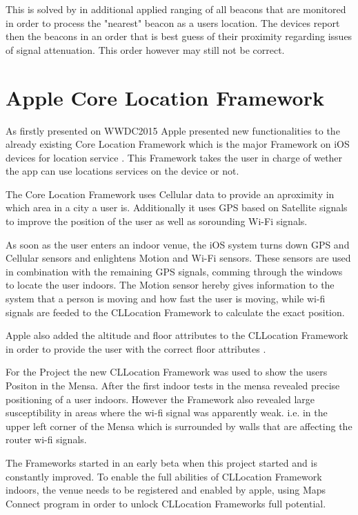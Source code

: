 This is solved by in additional applied ranging of all beacons that are monitored in order to process the "nearest" beacon as a users location. The devices report then the beacons in an order that is best guess of their proximity regarding issues of signal attenuation. This order however may still not be correct.\cite{appleIBeacon}

\section{Apple Core Location Framework}
As firstly presented on WWDC2015 \cite{wwdc15}  Apple presented new functionalities to the already existing Core Location Framework which is the major Framework on iOS devices for location service \cite{CLlocation}. This Framework takes the user in charge of wether the app can use locations services on the device or not.

The Core Location Framework uses Cellular data to provide an aproximity in which area in a city a user is. Additionally it uses GPS based on Satellite signals to improve the position of the user as well as sorounding Wi-Fi signals.

As soon as the user enters an indoor venue, the iOS system turns down GPS and Cellular sensors and enlightens Motion and Wi-Fi sensors. 
These sensors are used in combination with the remaining GPS signals, comming through the windows to locate the user indoors. The Motion sensor hereby gives information to the system that a person is moving and how fast the user is moving, while wi-fi signals are feeded to the CLLocation Framework to calculate the exact position.

Apple also added the altitude and floor attributes to the CLLocation Framework in order to provide the user with the correct floor attributes \cite{CLlocation}.

For the Project the new CLLocation Framework was used to show the users Positon in the Mensa. After the first indoor tests in the mensa revealed precise positioning of a user indoors. However the Framework also revealed large susceptibility in areas where the wi-fi signal was apparently weak. i.e. in the upper left corner of the Mensa which is surrounded by walls that are affecting the router wi-fi signals.

The Frameworks started in an early beta when this project started and is constantly improved. To enable the full abilities of CLLocation Framework indoors, the venue needs to be registered and enabled by apple, using Maps Connect program \cite{mapsConnect} in order to unlock CLLocation Frameworks full potential.

